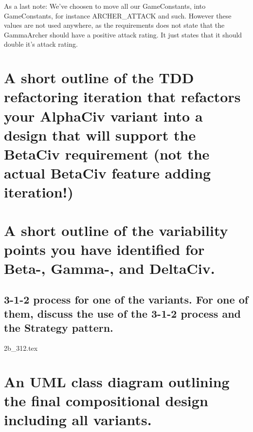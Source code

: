 As a last note:
We've choosen to move all our GameConstants, into GameConstants,
   for instance ARCHER\_ATTACK and such.
However these values are not used
   anywhere, as the requirements does not state that the GammaArcher should
   have a positive attack rating.
It just states that it should double it's attack rating.

\section*{
A short outline of the TDD refactoring iteration that refactors your AlphaCiv variant into a design that will support the BetaCiv requirement (not the actual BetaCiv feature adding iteration!) }

\section*{ A short outline of the variability points you have identified for Beta-, Gamma-, and DeltaCiv. }

\subsection*{ 3-1-2 process for one of the variants. For one of them, discuss the use of the 3-1-2 process and the Strategy pattern. }
 { 2b_312.tex }
\section*{ An UML class diagram outlining the final compositional design including all variants.}


